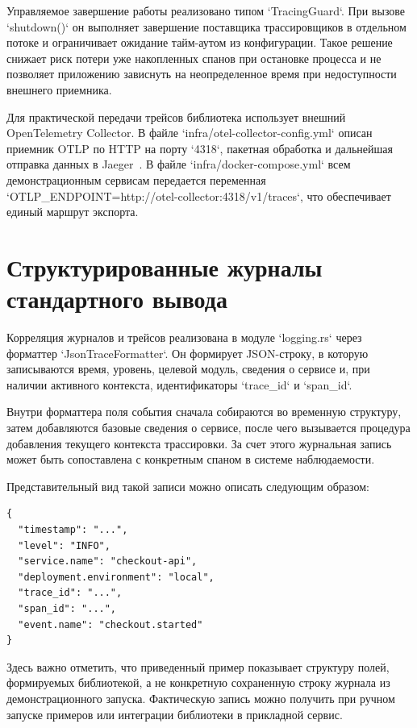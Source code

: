 Управляемое завершение работы реализовано типом `TracingGuard`. При вызове
`shutdown()` он выполняет завершение поставщика трассировщиков в отдельном потоке
и ограничивает ожидание тайм-аутом из конфигурации. Такое решение снижает риск
потери уже накопленных спанов при остановке процесса и не позволяет приложению
зависнуть на неопределенное время при недоступности внешнего приемника.

Для практической передачи трейсов библиотека использует внешний OpenTelemetry
Collector. В файле `infra/otel-collector-config.yml` описан приемник OTLP по
HTTP на порту `4318`, пакетная обработка и дальнейшая отправка данных в
Jaeger~\cite{otlpSpec,otlpExporterSpec,jaegerDocs}. В файле
`infra/docker-compose.yml` всем демонстрационным сервисам передается переменная
`OTLP_ENDPOINT=http://otel-collector:4318/v1/traces`, что обеспечивает единый
маршрут экспорта.

\section{Структурированные журналы стандартного вывода}

Корреляция журналов и трейсов реализована в модуле `logging.rs` через форматтер
`JsonTraceFormatter`. Он формирует JSON-строку, в которую записываются время,
уровень, целевой модуль, сведения о сервисе и, при наличии активного контекста,
идентификаторы `trace_id` и `span_id`.

Внутри форматтера поля события сначала собираются во временную структуру, затем
добавляются базовые сведения о сервисе, после чего вызывается процедура
добавления текущего контекста трассировки. За счет этого журнальная запись может
быть сопоставлена с конкретным спаном в системе наблюдаемости.

Представительный вид такой записи можно описать следующим образом:

\begin{verbatim}
{
  "timestamp": "...",
  "level": "INFO",
  "service.name": "checkout-api",
  "deployment.environment": "local",
  "trace_id": "...",
  "span_id": "...",
  "event.name": "checkout.started"
}
\end{verbatim}

Здесь важно отметить, что приведенный пример показывает структуру полей,
формируемых библиотекой, а не конкретную сохраненную строку журнала из
демонстрационного запуска. Фактическую запись можно получить при ручном запуске
примеров или интеграции библиотеки в прикладной сервис.

